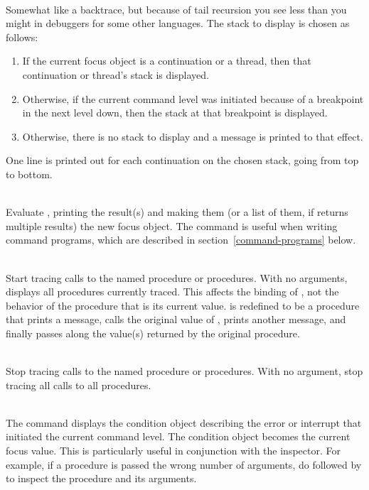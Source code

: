 \begin{description}
\item {}\\
    Somewhat like a backtrace, but because of tail recursion you see
    less than you might in debuggers for some other languages.
    The stack to display is chosen as follows:
\begin{enumerate}
    \item If the current focus object is a continuation or a thread,
       then that continuation or thread's stack is displayed.
    \item Otherwise, if the current command level was initiated because of
       a breakpoint in the next level down, then the stack at that
       breakpoint is displayed.
    \item Otherwise, there is no stack to display and a message is printed
       to that effect.
\end{enumerate}
    One line is printed out for each continuation on the chosen stack,
    going from top to bottom.

\item {}\\
    Evaluate , printing the result(s) and making them
    (or a list of them, if  returns multiple results)
    the new focus object.
    The  command is useful when writing
    command programs, which are described in section~\ref{command-programs} below.

\item {}\\
    Start tracing calls to the named procedure or procedures.
    With no arguments, displays all procedures currently traced.
    This affects the binding of , not the behavior of the
    procedure that is its current value.   is redefined
    to be a procedure that prints a message,
    calls the original value of , prints another
    message, and finally passes along the value(s) returned by the
    original procedure.

\item {}\\
    Stop tracing calls to the named procedure or procedures.
    With no argument, stop tracing all calls to all procedures.

\item {}\\
    The  command displays the condition object
    describing the error or interrupt that initiated the current
    command level.  The condition object becomes the current focus
    value.  This is particularly useful in conjunction with
    the inspector.  For example, if a procedure is passed the wrong number of
    arguments, do  followed by
      to inspect the
    procedure and its arguments.


\end{description}
